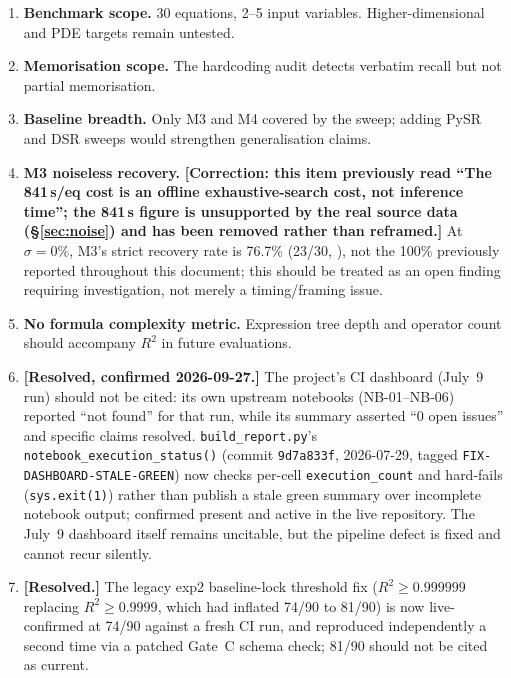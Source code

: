\documentclass[twoside,11pt]{article}
\newcommand{\Rsq}{R^{2}}
\begin{document}
\begin{enumerate}
  \item \textbf{Benchmark scope.} 30 equations, 2--5 input variables.
    Higher-dimensional and PDE targets remain untested.
  \item \textbf{Memorisation scope.} The hardcoding audit detects verbatim
    recall but not partial memorisation.
  \item \textbf{Baseline breadth.} Only M3 and M4 covered by the sweep;
    adding PySR and DSR sweeps would strengthen generalisation claims.
  \item \textbf{M3 noiseless recovery.} \textbf{[Correction: this item
    previously read ``The 841\,s/eq cost is an offline exhaustive-search
    cost, not inference time''; the 841\,s figure is unsupported by the
    real source data (\S\ref{sec:noise}) and has been removed rather than
    reframed.]} At $\sigma=0\%$, M3's strict recovery rate is 76.7\%
    (23/30, ), not the 100\% previously reported
    throughout this document; this should be treated as an open finding
    requiring investigation, not merely a timing/framing issue.
  \item \textbf{No formula complexity metric.} Expression tree depth and
    operator count should accompany $\Rsq$ in future evaluations.
  \item \textbf{[Resolved, confirmed 2026-09-27.]} The project's CI
    dashboard (July~9 run) should not be cited: its own upstream notebooks
    (NB-01--NB-06) reported ``not found'' for that run, while its summary
    asserted ``0 open issues'' and specific claims resolved.
    \texttt{build\_report.py}'s \texttt{notebook\_execution\_status()}
    (commit \texttt{9d7a833f}, 2026-07-29, tagged
    \texttt{FIX-DASHBOARD-STALE-GREEN}) now checks per-cell
    \texttt{execution\_count} and hard-fails (\texttt{sys.exit(1)}) rather
    than publish a stale green summary over incomplete notebook output;
    confirmed present and active in the live repository. The July~9
    dashboard itself remains uncitable, but the pipeline defect is fixed
    and cannot recur silently.
  \item \textbf{[Resolved.]} The legacy exp2 baseline-lock threshold
    fix ($R^2 \geq 0.999999$ replacing $R^2 \geq 0.9999$, which had
    inflated 74/90 to 81/90) is now live-confirmed at 74/90 against a
    fresh CI run, and reproduced independently a second time via a
    patched Gate~C schema check; 81/90 should not be cited as current.
\end{enumerate}
\end{document}
